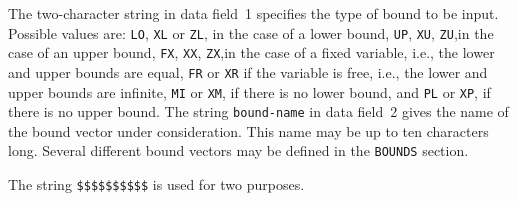\documentclass[a4paper]{article}
\begin{document}
The two-character string in data  field~1 specifies  the type of bound
to  be input.   Possible values are: {\tt LO},  {\tt XL} or {\tt ZL},
in the case of a lower bound,
{\tt UP}, {\tt  XU}, {\tt ZU},in the case of an upper  bound,
{\tt FX}, {\tt XX}, {\tt ZX},in the case of a fixed variable,
i.e., the lower and  upper bounds are equal,  {\tt  FR} or {\tt  XR} if the
variable is free,
i.e., the lower and upper bounds are infinite, {\tt MI}
or {\tt XM}, if there is no lower  bound, and {\tt PL} or  {\tt XP}, if there
is no  upper bound.
The  string  {\tt bound-name} in  data  field~2 gives  the name of the
bound vector   under consideration.    This  name may  be up   to  ten
characters long.   Several different bound  vectors may be  defined in
the {\tt BOUNDS} section.

The string {\tt \$\$\$\$\$\$\$\$\$\$} is used for two purposes.
\end{document}
